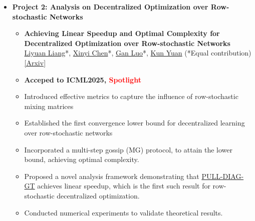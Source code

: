 \begin{itemize}
\begin{itemize}
              \item \textbf{Project 2: Analysis on Decentralized
Optimization over Row-stochastic Networks}
              \begin{itemize}
              \item \textbf{Achieving Linear Speedup and Optimal Complexity for Decentralized Optimization over Row-stochastic Networks}\\
              \href{https://lavaei.ieor.berkeley.edu/Group.html}{Liyuan Liang}*, \href{https://openreview.net/profile?id=~Xinyi_Chen9}{Xinyi Chen}*, \underline{Gan Luo}*, \href{https://kunyuan827.github.io}{Kun Yuan} (*Equal contribution) \href{https://arxiv.org/pdf/2506.04600}{[Arxiv]}
                  \item {\textbf{Acceped to ICML2025, \textcolor{red}{Spotlight}}}
                  \item {Introduced effective metrics to capture the influence of row-stochastic mixing matrices}
                  \item {Established the first convergence lower bound for decentralized learning over row-stochastic networks}
                  \item {Incorporated a multi-step gossip (MG) protocol, to attain the lower bound, achieving optimal complexity.}
                  \item {Proposed a novel analysis framework demonstrating that \href{https://arxiv.org/pdf/1803.09169}{PULL-DIAG-GT} achieves linear speedup, which is the first such result for row-stochastic decentralized optimization.}
                  \item{Conducted numerical experiments to validate theoretical results.}
              \end{itemize}
          \end{itemize}


\end{itemize}
